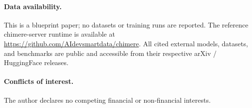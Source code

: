 \documentclass[10pt,a4paper]{article}
\theoremstyle{remark}
\begin{document}
\paragraph{Data availability.}
This is a blueprint paper; no datasets or training runs are reported.
The reference chimere-server runtime is available at
\url{https://github.com/AIdevsmartdata/chimere}. All cited external
models, datasets, and benchmarks are public and accessible from their
respective arXiv / HuggingFace releases.

\paragraph{Conflicts of interest.}
The author declares no competing financial or non-financial interests.

\end{document}
